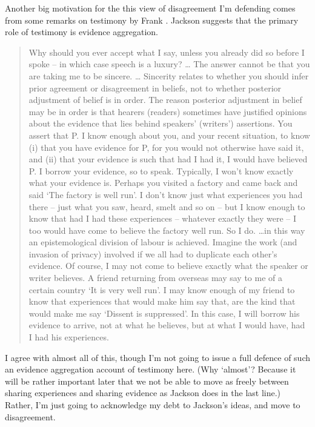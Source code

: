 Another big motivation for the this view of disagreement I'm defending comes from some remarks on testimony by \gls{Frank} \citet{Jackson1987}. Jackson suggests that the primary role of testimony is evidence aggregation.

\begin{quote}
Why should you ever accept what I say, unless you already did so before I spoke -- in which case speech is a luxury? {\ldots} The answer cannot be that you are taking me to be sincere. {\ldots} Sincerity relates to whether you should infer prior agreement or disagreement in beliefs, not to whether posterior adjustment of belief is in order. The reason posterior adjustment in belief may be in order is that hearers (readers) sometimes have justified opinions about the evidence that lies behind speakers' (writers') assertions. You assert that P. I know enough about you, and your recent situation, to know (i) that you have evidence for P, for you would not otherwise have said it, and (ii) that your evidence is such that had I had it, I would have believed P. I borrow your evidence, so to speak. Typically, I won't know exactly what your evidence is. Perhaps you visited a factory and came back and said `The factory is well run'. I don't know just what experiences you had there -- just what you saw, heard, smelt and so on -- but I know enough to know that had I had these experiences -- whatever exactly they were -- I too would have come to believe the factory well run. So I do. {\ldots}in this way an epistemological division of labour is achieved. Imagine the work (and invasion of privacy) involved if we all had to duplicate each other's evidence. Of course, I may not come to believe exactly what the speaker or writer believes. A friend returning from overseas may say to me of a certain country `It is very well run'. I may know enough of my friend to know that experiences that would make him say that, are the kind that would make me say `Dissent is suppressed'. In this case, I will borrow his evidence to arrive, not at what he believes, but at what I would have, had I had his experiences. ~\citep[92-3]{Jackson1987}
\end{quote}
I agree with almost all of this, though I'm not going to issue a full defence of such an evidence aggregation account of testimony here. (Why `almost'? Because it will be rather important later that we not be able to move as freely between sharing experiences and sharing evidence as Jackson does in the last line.) Rather, I'm just going to acknowledge my debt to Jackson's ideas, and move to disagreement.

